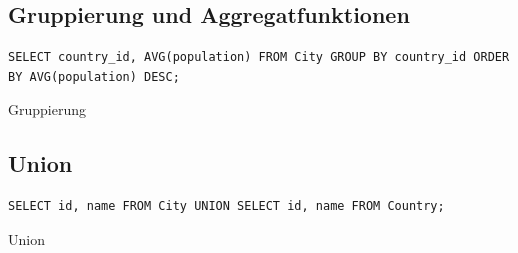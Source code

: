 \documentclass[a4paper]{article}
\begin{document}
\subsection{Gruppierung und Aggregatfunktionen}

\begin{listing}[H]
\begin{verbatim}
SELECT country_id, AVG(population) FROM City GROUP BY country_id ORDER BY AVG(population) DESC;
\end{verbatim}
\caption{Gruppierung}
\end{listing}

\subsection{Union}

\begin{listing}[H]
\begin{verbatim}
SELECT id, name FROM City UNION SELECT id, name FROM Country;
\end{verbatim}
\caption{Union}
\end{listing}

\begin{figure}[H]
\centering
{}
\end{figure}
\end{document}
